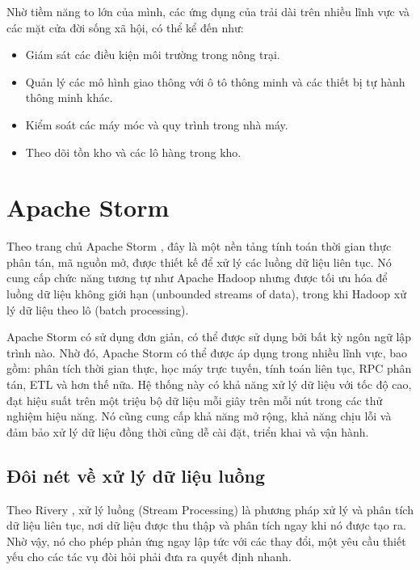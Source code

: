 Nhờ tiềm năng to lớn của mình, các ứng dụng của  trải dài trên nhiều lĩnh vực và các mặt cửa đời sống xã hội, có thể kể đến như:

\begin{itemize}
    \item Giám sát các điều kiện môi trường trong nông trại.
    \item Quản lý các mô hình giao thông với ô tô thông minh và các thiết bị tự hành thông minh khác.
    \item Kiểm soát các máy móc và quy trình trong nhà máy.
    \item Theo dõi tồn kho và các lô hàng trong kho.
\end{itemize}

\section{Apache Storm}

Theo trang chủ Apache Storm \autocite{apachestorm}, đây là một nền tảng tính toán thời gian thực phân tán, mã nguồn mở, được thiết kế để xử lý các luồng dữ liệu liên tục. Nó cung cấp chức năng tương tự như Apache Hadoop nhưng được tối ưu hóa để luồng dữ liệu không giới hạn (unbounded streams of data), trong khi Hadoop xử lý dữ liệu theo lô (batch processing).

Apache Storm có sử dụng đơn giản, có thể được sử dụng bởi bất kỳ ngôn ngữ lập trình nào. Nhờ đó, Apache Storm có thể được áp dụng trong nhiều lĩnh vực, bao gồm: phân tích thời gian thực, học máy trực tuyến, tính toán liên tục, RPC phân tán, ETL và hơn thế nữa. Hệ thống này có khả năng xử lý dữ liệu với tốc độ cao, đạt hiệu suất trên một triệu bộ dữ liệu mỗi giây trên mỗi nút trong các thử nghiệm hiệu năng. Nó cũng cung cấp khả năng mở rộng, khả năng chịu lỗi và đảm bảo xử lý dữ liệu đồng thời cũng dễ cài đặt, triển khai và vận hành.

\subsection{Đôi nét về xử lý dữ liệu luồng}

Theo Rivery \autocite{rivery_batch_vs_stream}, xử lý luồng (Stream Processing) là phương pháp xử lý và phân tích dữ liệu liên tục, nơi dữ liệu được thu thập và phân tích ngay khi nó được tạo ra. Nhờ vậy, nó cho phép phản ứng ngay lập tức với các thay đổi, một yêu cầu thiết yếu cho các tác vụ đòi hỏi phải đưa ra quyết định nhanh.

